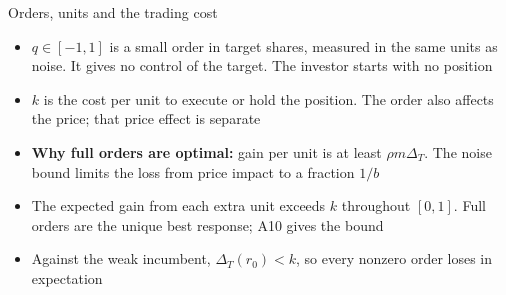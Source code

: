 \documentclass[10pt,aspectratio=169]{beamer}
\newcommand{\NavGap}{\par\vspace{0.45cm}}%
\let\AdapterBackButton\BackButton
\renewcommand{\BackButton}[1]{\NavGap\AdapterBackButton{#1}}%
\begin{document}
\begin{frame}[label=A11]{Orders, units and the trading cost}
\hypertarget{app:orders}{}
\begin{itemize}\setlength{\itemsep}{6pt}
\item $q\in[-1,1]$ is a small order in target shares, measured in the same units as noise. It gives no control of the target. The investor starts with no position
\item $k$ is the cost per unit to execute or hold the position. The order also affects the price; that price effect is separate
\item \textbf{Why full orders are optimal:} gain per unit is at least $\rho m\Delta_T$. The noise bound limits the loss from price impact to a fraction $1/b$
\item The expected gain from each extra unit exceeds $k$ throughout $[0,1]$. Full orders are the unique best response; A10 gives the bound
\item Against the weak incumbent, $\Delta_T(r_0)<k$, so every nonzero order loses in expectation
\end{itemize}
\end{frame}
\end{document}
